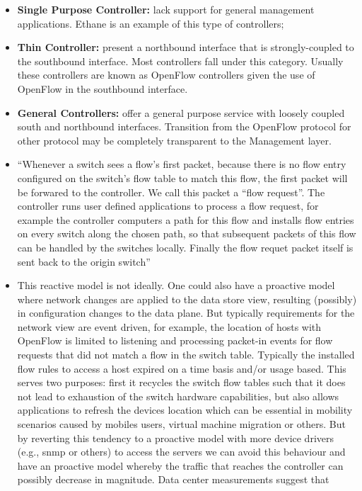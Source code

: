 \begin{itemize}
\begin{itemize}
\item[] \textbf{Single Purpose Controller:} lack support for general management
  applications. Ethane is an example of this type of controllers; 
\item[] \textbf{Thin Controller:} present a northbound interface that is
  strongly-coupled to the southbound interface. Most controllers fall
  under this category. Usually these controllers are known as OpenFlow controllers given the use of OpenFlow in the southbound interface.  
\item[] \textbf{General Controllers:} offer a general purpose service with loosely
  coupled south and northbound interfaces. Transition from the OpenFlow protocol for
  other protocol may  be completely transparent to the Management layer.
\end{itemize}


\begin{itemize}
\item ``Whenever a switch sees a flow's first packet, because there is no flow entry configured on the switch's flow table to match this flow, the first packet will be forwared to the controller. We call this packet a ``flow request''. The controller runs user defined applications to process a flow request, for example the controller computers a path for this flow and installs flow entries on every switch along the chosen path, so that subsequent packets of this flow can be handled by the switches locally. Finally the flow requet packet itself is sent back to the origin switch'' 


\item This reactive model is not ideally. One could also have a proactive model where network changes are applied to the data store view,  resulting (possibly) in configuration changes to the data plane. But typically requirements for the network view are event driven, for example, the location of hosts with OpenFlow is limited to listening and processing packet-in events for flow requests that did not match a flow in the switch table. Typically the installed flow rules to access a host expired on a time basis and/or usage based. This serves two purposes: first it recycles the switch flow tables such that it does not lead to exhaustion of the switch hardware capabilities, but also allows applications to refresh the devices location which can be essential in mobility scenarios caused by mobiles users, virtual machine migration or others. 
But by reverting this tendency to a proactive model with more device drivers (e.g., snmp or others) to access the servers we can avoid this behaviour and have an proactive model whereby the traffic that reaches the controller can possibly decrease in magnitude. Data center measurements suggest that 


\end{itemize}
\end{itemize}
